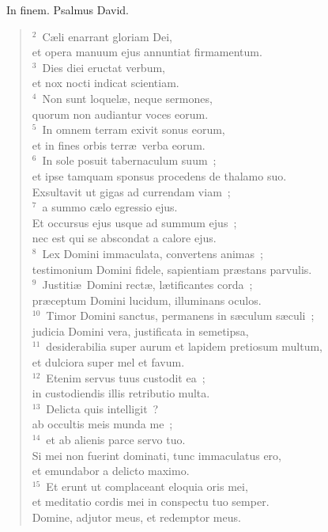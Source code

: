 ~\lettrine[lines=10,image=true,loversize=0.05,lraise=-0.03]{I}{}n finem. Psalmus David.
\begin{flushleft}\begin{verse}\vspace{6pt}${}^{2}$~C\ae li enarrant gloriam Dei,\\ et opera manuum ejus annuntiat firmamentum.\\
${}^{3}$~Dies diei eructat verbum,\\ et nox nocti indicat scientiam.\\
${}^{4}$~Non sunt loquel\ae , neque sermones,\\ quorum non audiantur voces eorum.\\
${}^{5}$~In omnem terram exivit sonus eorum,\\ et in fines orbis terr\ae\ verba eorum.\\
${}^{6}$~In sole posuit tabernaculum suum~;\\ et ipse tamquam sponsus procedens de thalamo suo.\\ Exsultavit ut gigas ad currendam viam~;\\
${}^{7}$~a summo c\ae lo egressio ejus.\\ Et occursus ejus usque ad summum ejus~;\\ nec est qui se abscondat a calore ejus.\\
${}^{8}$~Lex Domini immaculata, convertens animas~;\\ testimonium Domini fidele, sapientiam pr\ae stans parvulis.\\
${}^{9}$~Justiti\ae\ Domini rect\ae , l\ae tificantes corda~;\\ pr\ae ceptum Domini lucidum, illuminans oculos.\\
${}^{10}$~Timor Domini sanctus, permanens in s\ae culum s\ae culi~;\\ judicia Domini vera, justificata in semetipsa,\\
${}^{11}$~desiderabilia super aurum et lapidem pretiosum multum,\\ et dulciora super mel et favum.\\
${}^{12}$~Etenim servus tuus custodit ea~;\\ in custodiendis illis retributio multa.\\
${}^{13}$~Delicta quis intelligit~?\\ ab occultis meis munda me~;\\
${}^{14}$~et ab alienis parce servo tuo.\\ Si mei non fuerint dominati, tunc immaculatus ero,\\ et emundabor a delicto maximo.\\
${}^{15}$~Et erunt ut complaceant eloquia oris mei,\\ et meditatio cordis mei in conspectu tuo semper.\\ Domine, adjutor meus, et redemptor meus.\end{verse}\end{flushleft}


